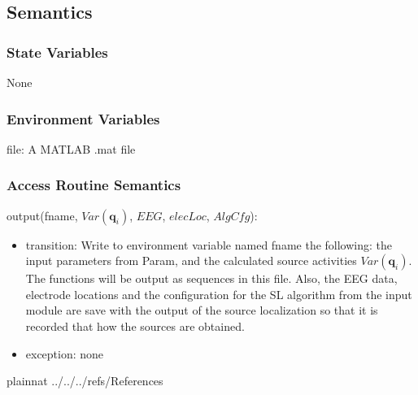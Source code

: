 \documentclass[12pt, titlepage]{article}
\begin{document}
\subsection{Semantics}

\subsubsection{State Variables}

None

\subsubsection{Environment Variables}

file: A MATLAB .mat file

\subsubsection{Access Routine Semantics}

\noindent output(fname, $Var(\mathbf q_i)$, $EEG$, $elecLoc$, $AlgCfg$):
\begin{itemize}
\item transition:  Write to environment variable named fname the
  following: the input  parameters from Param, and the calculated source activities $Var(\mathbf q_i)$.  The functions will be output as sequences in this file. Also, the EEG data, electrode locations and the configuration for the SL algorithm from the input module are save with the output of the source localization so that it is recorded that how the sources are obtained.
\item exception: none
\end{itemize}



\newpage

 {plainnat}
 {../../../refs/References}

%

\end{document}
